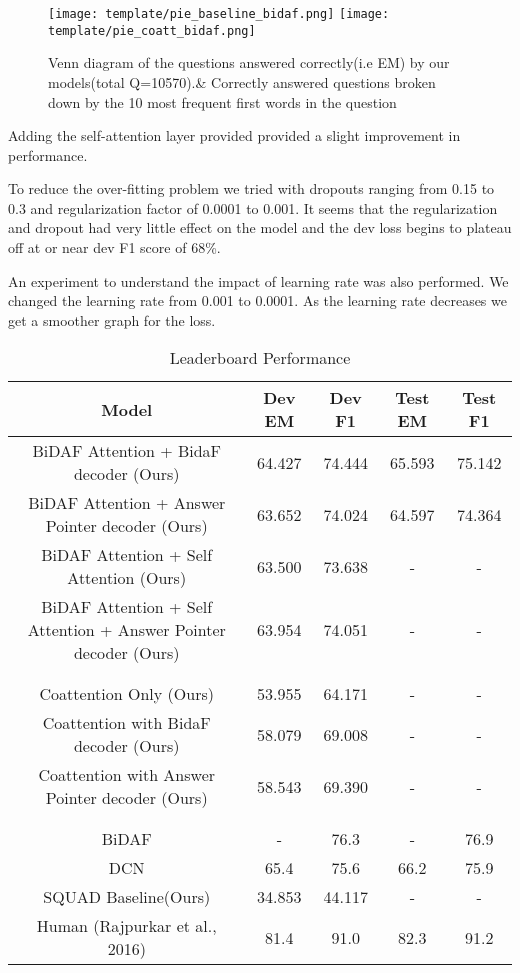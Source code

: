 \documentclass{article} %
\begin{document}
\begin{figure}
  \texttt{[image: template/pie\_baseline\_bidaf.png]}
\endminipage\hfill
{}
  \texttt{[image: template/pie\_coatt\_bidaf.png]}
\endminipage\hfill
\caption{Venn diagram of the questions answered correctly(i.e EM) by our models(total Q=10570).\& Correctly answered questions broken down by the 10 most frequent first words in the question}
\end{figure}

Adding the self-attention layer provided provided a slight improvement in performance.

To reduce the over-fitting problem we tried with dropouts ranging from 0.15 to 0.3 and regularization factor of 0.0001 to 0.001. It seems that the regularization and dropout had very little effect on the model and the dev loss begins to plateau off at or near dev F1 score of 68\%.

An experiment to understand the impact of learning rate was also performed. We changed the learning rate from 0.001 to 0.0001. As the learning rate decreases we get a smoother graph for the loss.



\begin{table}[ht]
\caption{Leaderboard Performance} %
\centering %
\begin{tabular}{c c c c c} %
\hline\hline %
Model & Dev EM & Dev F1 & Test EM & Test F1 \\ [0.5ex] %
\hline %
BiDAF Attention + BidaF decoder (Ours) & 64.427 & 74.444 & 65.593 & 75.142 \\
BiDAF Attention + Answer Pointer decoder (Ours) & 63.652 & 74.024 & 64.597 & 74.364 \\ 	
BiDAF Attention + Self Attention (Ours) & 63.500 & 73.638 & - & -\\
BiDAF Attention + Self Attention + Answer Pointer decoder (Ours) & 63.954 & 74.051 & - & -\\
\\ \hline \\
Coattention Only (Ours) & 53.955 & 64.171 & - & -\\
Coattention with BidaF decoder (Ours) & 58.079 & 69.008 & - & -\\
Coattention with Answer Pointer decoder (Ours) & 58.543 & 69.390 & - & -\\
\\ \hline \\
BiDAF & - & 76.3 & - & 76.9\\
DCN  & 65.4 & 75.6 & 66.2 & 75.9\\
SQUAD Baseline(Ours) & 34.853 & 44.117 & - & -\\
Human (Rajpurkar et al., 2016) & 81.4 & 91.0 & 82.3 & 91.2\\ [1ex] %
\hline %
\end{tabular}
\label{table:nonlin} %
\end{table}
\end{document}
